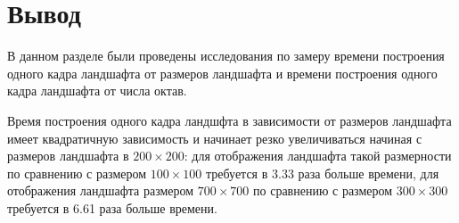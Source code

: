 \section{Вывод}

В данном разделе были проведены исследования по замеру времени построения одного кадра ландшафта от размеров ландшафта и времени построения одного кадра  ландшафта от числа октав.

Время построения одного кадра ландшфта в зависимости от размеров ландшафта имеет квадратичную зависимость и начинает резко увеличиваться начиная с размеров ландшафта в $200\times200$: для отображения ландшафта такой размерности по сравнению с размером  $100\times100$ требуется в 3.33 раза больше времени, для отображения ландшафта размером $700\times700$ по сравнению с размером  $300\times300$ требуется в 6.61 раза больше времени.





